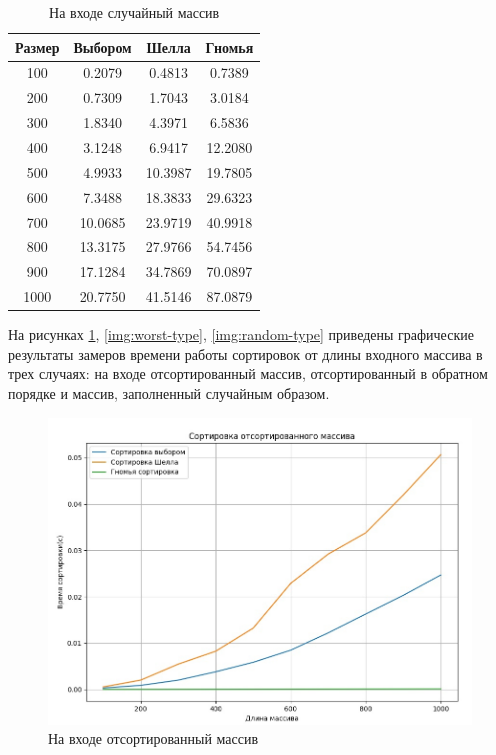 \begin{table}[h]
	\begin{center}
		\begin{threeparttable}
		\captionsetup{justification=raggedleft,singlelinecheck=off}
		\caption{На входе случайный массив}
		\label{tbl:random}
		\begin{tabular}{|c|c|c|c|}
			\hline
			Размер & Выбором & Шелла & Гномья \\
			\hline
  			100 & 0.2079 & 0.4813 & 0.7389 \\ 
 			\hline
  			200 & 0.7309 & 1.7043 & 3.0184 \\ 
 			\hline
  			300 & 1.8340 & 4.3971 & 6.5836 \\ 
 			\hline
  			400 & 3.1248 & 6.9417 & 12.2080 \\ 
 			\hline
  			500 & 4.9933 & 10.3987 & 19.7805 \\ 
 			\hline
  			600 & 7.3488 & 18.3833 & 29.6323 \\ 
 			\hline
  			700 & 10.0685 & 23.9719 & 40.9918 \\ 
 			\hline
  			800 & 13.3175 & 27.9766 & 54.7456 \\ 
 			\hline
  			900 & 17.1284 & 34.7869 & 70.0897 \\ 
 			\hline
 			1000 & 20.7750 & 41.5146 & 87.0879 \\ 
 			\hline
		\end{tabular}
		\end{threeparttable}
    \end{center}
\end{table}

На рисунках \ref{img:best-type}, \ref{img:worst-type}, \ref{img:random-type} приведены графические результаты замеров времени работы сортировок от длины входного массива в трех случаях: на входе отсортированный массив, отсортированный в обратном порядке и массив, заполненный случайным образом.

\begin{figure}[H]
	\begin{center}
		\includegraphics[scale=0.4]{img/best-type.jpg}
	\end{center}
	\captionsetup{justification=centering}
	\caption{На входе отсортированный массив}
	\label{img:best-type}
\end{figure}


